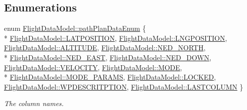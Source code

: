 \subsection*{Enumerations}
\begin{DoxyCompactItemize}
\item 
enum \hyperlink{group___path_gaa0908516cbd02b164b605fce903d9066}{Flight\-Data\-Model\-::path\-Plan\-Data\-Enum} \{ \\*
\hyperlink{group___path_ggaa0908516cbd02b164b605fce903d9066a13024b57ed66f819f1bd7a7be0e11547}{Flight\-Data\-Model\-::\-L\-A\-T\-P\-O\-S\-I\-T\-I\-O\-N}, 
\hyperlink{group___path_ggaa0908516cbd02b164b605fce903d9066a62e4abf60e84ec15a1d55ccead4a171d}{Flight\-Data\-Model\-::\-L\-N\-G\-P\-O\-S\-I\-T\-I\-O\-N}, 
\hyperlink{group___path_ggaa0908516cbd02b164b605fce903d9066a6cb875c2764969992994d66ba514a189}{Flight\-Data\-Model\-::\-A\-L\-T\-I\-T\-U\-D\-E}, 
\hyperlink{group___path_ggaa0908516cbd02b164b605fce903d9066a17bce9ec0e6fab7e3abc296781e3acbe}{Flight\-Data\-Model\-::\-N\-E\-D\-\_\-\-N\-O\-R\-T\-H}, 
\\*
\hyperlink{group___path_ggaa0908516cbd02b164b605fce903d9066ac273ffece3fb399e96824a7c940fbb66}{Flight\-Data\-Model\-::\-N\-E\-D\-\_\-\-E\-A\-S\-T}, 
\hyperlink{group___path_ggaa0908516cbd02b164b605fce903d9066a8132be414bfac5bfc9a86e3fa3c2c4c2}{Flight\-Data\-Model\-::\-N\-E\-D\-\_\-\-D\-O\-W\-N}, 
\hyperlink{group___path_ggaa0908516cbd02b164b605fce903d9066a1893f60afdc05d0fc0c762e8f74f6b89}{Flight\-Data\-Model\-::\-V\-E\-L\-O\-C\-I\-T\-Y}, 
\hyperlink{group___path_ggaa0908516cbd02b164b605fce903d9066abc9a6ccea3fe42c5fb3b77401f59e3e0}{Flight\-Data\-Model\-::\-M\-O\-D\-E}, 
\\*
\hyperlink{group___path_ggaa0908516cbd02b164b605fce903d9066a8c8d56fc223af4d252e65152fbf61c5f}{Flight\-Data\-Model\-::\-M\-O\-D\-E\-\_\-\-P\-A\-R\-A\-M\-S}, 
\hyperlink{group___path_ggaa0908516cbd02b164b605fce903d9066acf92b5f5aa8947d83f18ff9d9dbb1681}{Flight\-Data\-Model\-::\-L\-O\-C\-K\-E\-D}, 
\hyperlink{group___path_ggaa0908516cbd02b164b605fce903d9066a87ddbd86791c5f58af0900f25ea3e0a7}{Flight\-Data\-Model\-::\-W\-P\-D\-E\-S\-C\-R\-I\-T\-P\-T\-I\-O\-N}, 
\hyperlink{group___path_ggaa0908516cbd02b164b605fce903d9066a9a93aeb591b9c29b835458cbbfc825c5}{Flight\-Data\-Model\-::\-L\-A\-S\-T\-C\-O\-L\-U\-M\-N}
 \}
\begin{DoxyCompactList}\small\item\em The column names. \end{DoxyCompactList}\end{DoxyCompactItemize}
